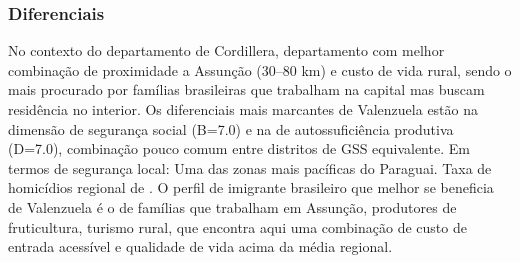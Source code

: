 \subsubsection*{Diferenciais}\label{dif-valenzuela-0319}
No contexto do departamento de Cordillera, departamento com melhor combinação de proximidade a Assunção (30–80 km) e custo de vida rural, sendo o mais procurado por famílias brasileiras que trabalham na capital mas buscam residência no interior. Os diferenciais mais marcantes de Valenzuela estão na dimensão de segurança social (B=7.0) e na de autossuficiência produtiva (D=7.0), combinação pouco comum entre distritos de GSS equivalente. Em termos de segurança local: Uma das zonas mais pacíficas do Paraguai. Taxa de homicídios regional de . O perfil de imigrante brasileiro que melhor se beneficia de Valenzuela é o de famílias que trabalham em Assunção, produtores de fruticultura, turismo rural, que encontra aqui uma combinação de custo de entrada acessível e qualidade de vida acima da média regional.
